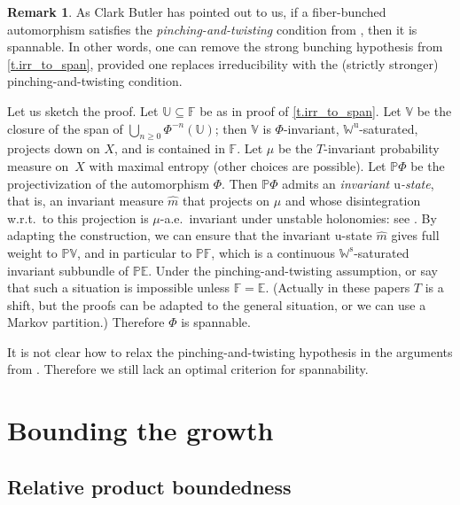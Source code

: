 \documentclass[10pt]{amsart}
\theoremstyle{plain}
\theoremstyle{definition}
\newtheorem{remark}[theorem]{Remark}
\newcommand{\EE}{\mathbb{E}}
\newcommand{\FF}{\mathbb{F}}
\newcommand{\PP}{\mathbb{P}}
\newcommand{\WW}{\mathbb{W}}
\newcommand{\uu}{\mathrm{u}}
\renewcommand{\ss}{\mathrm{s}}
\begin{document}
\begin{remark}\label{r.Clark}
As Clark Butler has pointed out to us, if a fiber-bunched automorphism satisfies the \emph{pinching-and-twisting} condition from \cite[Def.\,1.3]{BV}, \cite[Def.\,1.2]{AV_Portugalia} then it is spannable.
In other words, one can remove the strong bunching hypothesis from \cref{t.irr_to_span}, provided one replaces irreducibility with the (strictly stronger) pinching-and-twisting condition.

Let us sketch the proof.
Let $\mathbb{U} \subseteq \FF$ be as in proof of \cref{t.irr_to_span}.
Let $\mathbb{V}$ be the closure of the span of $\bigcup_{n\ge 0} \Phi^{-n}(\mathbb{U})$; then $\mathbb{V}$ is $\Phi$-invariant, $\WW^\uu$-saturated, projects down on $X$, and is contained in $\FF$.
Let $\mu$ be the $T$-invariant probability measure on~$X$ with maximal entropy (other choices are possible).
Let $\PP\Phi$ be the projectivization of the automorphism $\Phi$.
Then $\PP\Phi$ admits an \emph{invariant $\mathrm{u}$-state}, that is, an invariant measure $\hat m$ that projects on $\mu$ and whose disintegration w.r.t.\ to this projection is $\mu$\nobreakdash-a.e.\
invariant under unstable holonomies: see \cite[\S4.1]{AV_Portugalia}.
By adapting the construction, we can ensure that the invariant $\mathrm{u}$-state $\hat m$ gives full weight to $\PP \mathbb{V}$, and in particular to $\PP\FF$, which is a continuous $\WW^\ss$-saturated invariant subbundle of $\PP\EE$.
Under the pinching-and-twisting assumption, \cite[Prop.\,5.1]{BV} or \cite[Prop.\,5.1]{AV_Portugalia} say that such a situation is impossible unless $\FF = \EE$. (Actually in these papers $T$ is a shift, but the proofs can be adapted to the general situation, or we can use a Markov partition.) Therefore $\Phi$ is spannable.

It is not clear how to relax the pinching-and-twisting hypothesis in the arguments from \cite{BV,AV_Portugalia}.
Therefore we still lack an optimal criterion for spannability.
\end{remark}

\section{Bounding the growth}\label{s.bounded}

\subsection{Relative product boundedness}\label{ss.RPB}
\end{document}
